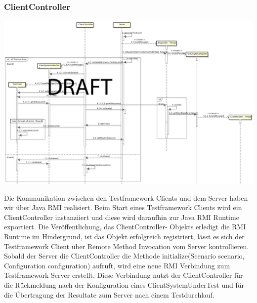 \subsubsection{ClientController}
\label{sec:clientController}

\begin{center}
\includegraphics[scale=0.3]{image_testFramework/TestFWServerClientSeq.png}
\end{center}
 
Die Kommunikation zwischen den Testframework Clients und dem Server haben wir über Java RMI realisiert. Beim Start eines Testframework Clients wird ein ClientController instanziiert und diese wird daraufhin zur Java RMI Runtime exportiert. Die Veröffentlichung, das ClientController- Objekts erledigt die RMI Runtime im Hindergrund, ist das Objekt erfolgreich registriert, lässt es sich der Testframework Client über Remote Method Invocation vom Server kontrollieren. Sobald der Server die ClientController die Methode initialize(Scenario scenario, Configuration configuration) aufruft, wird eine neue RMI Verbindung zum Testframework Server erstellt. Diese Verbindung nutzt der ClientController für die Rückmeldung nach der Konfiguration eines ClientSystemUnderTest und für die Übertragung der Resultate zum Server nach einem Testdurchlauf.

